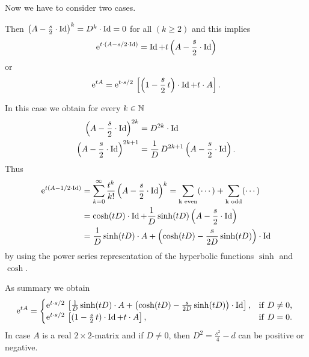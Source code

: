 Now we have to consider two cases.
\begin{description}[wide, labelindent=0em]

\item[$ D^{2} = 0 $: ] 
Then $\left( A - \frac{s}{2}  \cdot \operatorname{Id} \right)^{k} = D^{k} \cdot \operatorname{Id} = 0 $  for all $ (k \geq 2)$ and this implies 
%
\[
	  \mathrm{e}^{t \cdot \left( A - s/2  \cdot \operatorname{Id} \right)} = \operatorname{Id} + t \left(  A - \frac{s}{2}  \cdot \operatorname{Id} \right)
\]
%
or
%
\[
	 \mathrm{e}^{t A } =  \mathrm{e}^{t\cdot s/2} \, \left[ \left( 1 - \frac{s}{2} \, t \right )\cdot \operatorname{Id} + t \cdot A \right] .
\]
%
\item[$ D^{2} \neq 0 $: ]
In this case we obtain for every $ k \in \mathbb{N} $
%
\begin{align*}
	\left( A - \frac{s}{2} \cdot \operatorname{Id} \right)^{2k}  &= D^{2k} \cdot \operatorname{Id} \\ 
	\left( A - \frac{s}{2}  \cdot \operatorname{Id} \right)^{2k+1} &=\frac{1}{D} \, D^{2k+1}\left( A - \frac{s}{2} \cdot \operatorname{Id} \right) .
\end{align*}
Thus 
\begin{align*}
	 \mathrm{e}^{t( A - 1/2  \cdot \operatorname{Id} )} 
		& = \sum_{k=0}^\infty \frac{t^k}{k!}\left( A - \frac{s}{2}  \cdot \operatorname{Id} \right)^k 
		= \sum_{ \text{k even} } (\cdots) + \sum_{ \text{k odd} } (\cdots)  \\
	&= \cosh( t D ) \cdot \operatorname{Id} + \frac{1}{D} \sinh( t D ) \left( A - \frac{s}{2}  \cdot \operatorname{Id} \right) \\
	&= \frac{ 1 }{ D } \sinh( tD )\cdot A + \left( \cosh(tD) - \frac{s}{2D} \sinh(tD) \right) \cdot \operatorname{Id}
\end{align*}
by using the power series representation of the hyperbolic functions $ \sinh $ and $ \cosh $.
\end{description}
As summary we obtain
\begin{equation*}\label{eq:exp-rep}
	 \mathrm{e}^{tA} =
	\begin{cases}
		 \mathrm{e}^{t \cdot s/2} \, \left[ \frac{1}{D} \sinh(t D)  \cdot A + 
			\left( \cosh(tD) - \frac{s}{2D} \sinh(tD) \right) \cdot \operatorname{Id} \right], & 
									\text{if\/ $ D \neq 0 $, } \\
		 \mathrm{e}^{t \cdot s/2} \, \left[ ( 1 - \frac{s}{2} \, t )\cdot \operatorname{Id} + t \cdot A \right], &
									\text{if\/ $ D = 0 $.}
	\end{cases}
\end{equation*}
In case $A$ is a real $2 \times2$-matrix and if\/ $ D \neq 0 $, then 
$ D^{2} = \frac{s^{2}}{4} - d $ can be positive or negative. 

